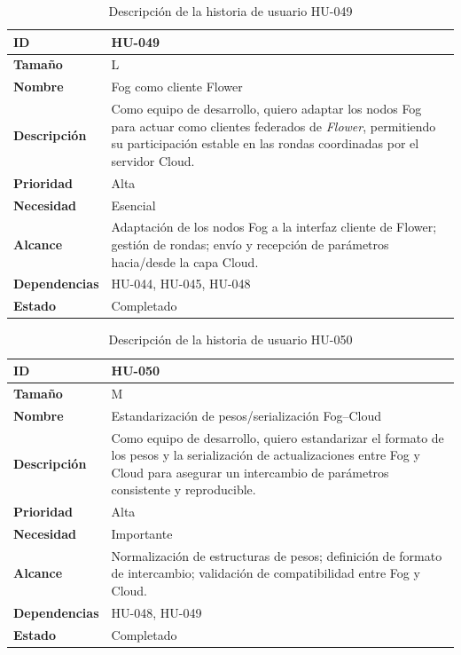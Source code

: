 \documentclass{report}
\begin{document}
\begin{table}[H]
\centering
\caption{Descripción de la historia de usuario HU-049}
\label{tab:hu049}
\begin{tabular}{|l|p{12cm}|}
\hline
\textbf{ID} & HU-049 \\ \hline
\textbf{Tamaño} & L \\ \hline
\textbf{Nombre} & Fog como cliente Flower \\ \hline
\textbf{Descripción} &
Como equipo de desarrollo, quiero adaptar los nodos Fog para actuar como clientes federados de \textit{Flower}, permitiendo su participación estable en las rondas coordinadas por el servidor Cloud. \\ \hline
\textbf{Prioridad} & Alta \\ \hline
\textbf{Necesidad} & Esencial \\ \hline
\textbf{Alcance} &
Adaptación de los nodos Fog a la interfaz cliente de Flower; gestión de rondas; envío y recepción de parámetros hacia/desde la capa Cloud. \\ \hline
\textbf{Dependencias} & HU-044, HU-045, HU-048 \\ \hline
\textbf{Estado} & Completado \\ \hline
\end{tabular}
\end{table}



\begin{table}[H]
\centering
\caption{Descripción de la historia de usuario HU-050}
\label{tab:hu050}
\begin{tabular}{|l|p{12cm}|}
\hline
\textbf{ID} & HU-050 \\ \hline
\textbf{Tamaño} & M \\ \hline
\textbf{Nombre} & Estandarización de pesos/serialización Fog--Cloud \\ \hline
\textbf{Descripción} &
Como equipo de desarrollo, quiero estandarizar el formato de los pesos y la serialización de actualizaciones entre Fog y Cloud para asegurar un intercambio de parámetros consistente y reproducible. \\ \hline
\textbf{Prioridad} & Alta \\ \hline
\textbf{Necesidad} & Importante \\ \hline
\textbf{Alcance} &
Normalización de estructuras de pesos; definición de formato de intercambio; validación de compatibilidad entre Fog y Cloud. \\ \hline
\textbf{Dependencias} & HU-048, HU-049 \\ \hline
\textbf{Estado} & Completado \\ \hline
\end{tabular}
\end{table}
\end{document}
